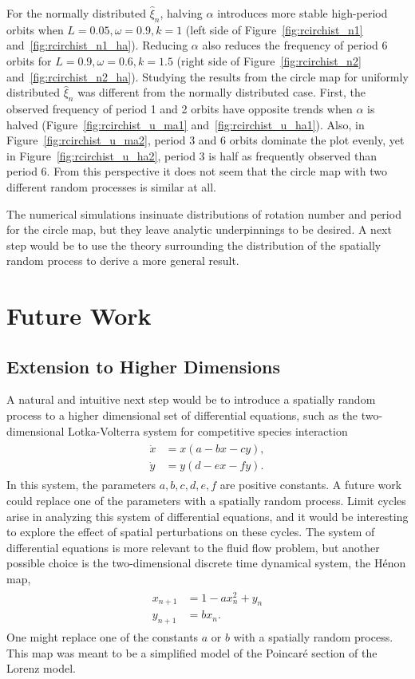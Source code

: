 For the normally distributed $\hat{\xi}_n$, halving
$\alpha$ introduces more stable high-period orbits when
$L=0.05,\omega=0.9,k=1$ (left side of Figure~\ref{fig:rcirchist_n1} and~\ref{fig:rcirchist_n1_ha}). Reducing
$\alpha$ also reduces the frequency of period 6 orbits for
$L=0.9,\omega=0.6,k=1.5$ (right side of Figure~\ref{fig:rcirchist_n2}
and~\ref{fig:rcirchist_n2_ha}). Studying the results from the circle
map for uniformly distributed
$\hat{\xi}_n$ was different from the normally distributed case. First,
the observed frequency of period 1 and 2 orbits have opposite trends when $\alpha$ is
halved (Figure~\ref{fig:rcirchist_u_ma1}
and~\ref{fig:rcirchist_u_ha1}). Also, in Figure~\ref{fig:rcirchist_u_ma2},
period 3 and 6 orbits dominate the plot evenly, yet in
Figure~\ref{fig:rcirchist_u_ha2}, period 3 is half as frequently observed than
period 6. From this perspective it does not seem that the circle map
with two different random processes is similar at all.

The numerical simulations insinuate distributions of
rotation number and period for the circle map, but they leave analytic
underpinnings to be desired. A next step would be to use the theory
surrounding the distribution of the spatially random process to derive
a more general result.
\section{Future Work}
\subsection{Extension to Higher Dimensions}
A natural and intuitive next step would be to introduce a spatially
random process to a higher dimensional set of differential equations, such as the
two-dimensional Lotka-Volterra
system for competitive species interaction
\begin{align}
\begin{split}
\dot{x} &= x(a-bx-cy),\\
\dot{y} &= y(d-ex-fy).
\end{split}
\end{align}
In this system, the parameters $a,b,c,d,e,f$ are positive
constants. A
future work could replace one of the parameters with a spatially
random process. Limit cycles arise in analyzing this system of
differential equations, and it would be interesting to explore the
effect of spatial perturbations on these cycles. The system of differential equations is more relevant to
the fluid flow problem, but another possible
choice is the two-dimensional discrete time dynamical system, the H\'{e}non map,
\begin{align}
\begin{split}
x_{n+1}&=1-ax_n^2+y_n\\
y_{n+1}&=bx_n.
\end{split}
\end{align}
One might replace one of the constants $a$ or $b$ with a spatially random
process. This map was meant to be a simplified model of the
Poincar\'{e} section of the Lorenz model. 
